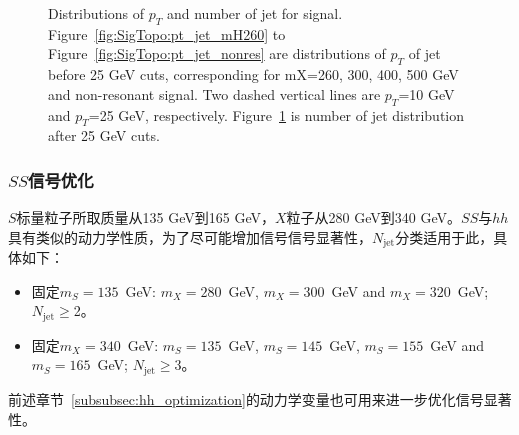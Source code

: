 \begin{figure}
\begin{subfigure}[b]{0.45\textwidth}
 \label{fig:SigTopo:numOfjet_sig}
\end{subfigure}
\caption{Distributions of $p_T$ and number of jet for signal. Figure~\ref{fig:SigTopo:pt_jet_mH260} to Figure~\ref{fig:SigTopo:pt_jet_nonres} are distributions of $p_T$ of jet before 25 GeV cuts, corresponding for mX=260, 300, 400, 500 GeV and non-resonant signal. Two dashed vertical lines are $p_T$=10 GeV and $p_T$=25 GeV, respectively. Figure~\ref{fig:SigTopo:numOfjet_sig} is number of jet distribution after 25 GeV cuts.}
\label{fig:SigTopo:pt_jet}
\end{figure}

\subsubsection{$SS$信号优化}
$S$标量粒子所取质量从135 GeV到165 GeV，$X$粒子从280 GeV到340 GeV。$SS$与$hh$具有类似的动力学性质，为了尽可能增加信号信号显著性，$N_\text{jet}$分类适用于此，具体如下：
\begin{itemize}
 \item 固定$m_S=135$~GeV: $m_X=280$~GeV, $m_X=300$~GeV and $m_X=320$~GeV; $N_{\text{jet}}\geq$2。
 \item 固定$m_X=340$~GeV: $m_S=135$~GeV, $m_S=145$~GeV, $m_S=155$~GeV and $m_S=165$~GeV; $N_{\text{jet}}\geq$3。
\end{itemize}
前述章节~\ref{subsubsec:hh_optimization}的动力学变量也可用来进一步优化信号显著性。
